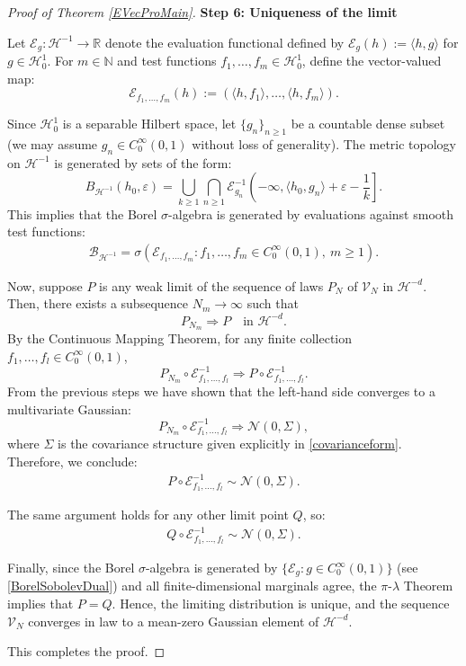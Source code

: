 \documentclass[11pt, reqno]{amsart}
\numberwithin{equation}{section}
\begin{document}
\begin{proof}[Proof of Theorem \ref{EVecProMain}]
\noindent\textbf{Step 6: Uniqueness of the limit}

Let $\mathcal{E}_g : \mathcal{H}^{-1} \to \mathbb{R}$ denote the evaluation functional defined by $\mathcal{E}_g(h) := \langle h, g \rangle$ for $g \in \mathcal{H}_0^1$. For $m \in \mathbb{N}$ and test functions $f_1, \ldots, f_m \in \mathcal{H}_0^1$, define the vector-valued map:
\[
\mathcal{E}_{f_1, \ldots, f_m}(h) := \left( \langle h, f_1 \rangle, \ldots, \langle h, f_m \rangle \right).
\]

Since $\mathcal{H}_0^1$ is a separable Hilbert space, let $\{g_n\}_{n \ge 1}$ be a countable dense subset (we may assume $g_n \in C_0^\infty(0,1)$ without loss of generality). The metric topology on $\mathcal{H}^{-1}$ is generated by sets of the form:
\[
B_{\mathcal{H}^{-1}}(h_0, \varepsilon) = \bigcup_{k \ge 1} \bigcap_{n \ge 1} \mathcal{E}_{g_n}^{-1} \left( -\infty, \langle h_0, g_n \rangle + \varepsilon - \frac{1}{k} \right].
\]
This implies that the Borel $\sigma$-algebra is generated by evaluations against smooth test functions:
\begin{align}
\label{BorelSobolevDual}
\mathcal{B}_{\mathcal{H}^{-1}} = \sigma\left( \mathcal{E}_{f_1, \ldots, f_m} : f_1, \ldots, f_m \in C_0^\infty(0,1),\ m \ge 1 \right).
\end{align}

Now, suppose $P$ is any weak limit of the sequence of laws $P_N$ of $\mathcal V_N$ in $\mathcal{H}^{-d}$. Then, there exists a subsequence $N_m \to \infty$ such that
\[
P_{N_m} \Rightarrow P \quad \text{in } \mathcal{H}^{-d}.
\]
By the Continuous Mapping Theorem, for any finite collection $f_1, \ldots, f_l \in C_0^\infty(0,1)$,
\[
P_{N_m} \circ \mathcal{E}_{f_1, \ldots, f_l}^{-1} \Rightarrow P \circ \mathcal{E}_{f_1, \ldots, f_l}^{-1}.
\]
From the previous steps we have shown that the left-hand side converges to a multivariate Gaussian:
\[
P_{N_m} \circ \mathcal{E}_{f_1, \ldots, f_l}^{-1} \Rightarrow \mathcal{N}(0, \Sigma),
\]
where $\Sigma$ is the covariance structure given explicitly in \eqref{covarianceform}. Therefore, we conclude:
\begin{align}
\label{EVecprolim1}
P \circ \mathcal{E}_{f_1, \ldots, f_l}^{-1} \sim \mathcal{N}(0, \Sigma).
\end{align}

The same argument holds for any other limit point $Q$, so:
\begin{align}
\label{EVecprolim2}
Q \circ \mathcal{E}_{f_1, \ldots, f_l}^{-1} \sim \mathcal{N}(0, \Sigma).
\end{align}

Finally, since the Borel $\sigma$-algebra is generated by $\{ \mathcal{E}_g : g \in C_0^\infty(0,1) \}$ (see \eqref{BorelSobolevDual}) and all finite-dimensional marginals agree, the $\pi$-$\lambda$ Theorem implies that $P = Q$. Hence, the limiting distribution is unique, and the sequence $\mathcal V_N$ converges in law to a mean-zero Gaussian element of $\mathcal{H}^{-d}$.

This completes the proof.

\end{proof}
\end{document}

